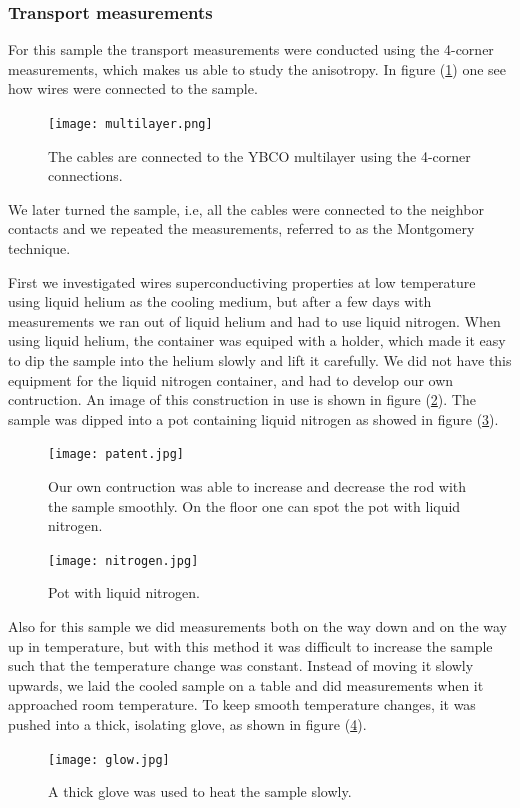 \documentclass{comjnl}
\begin{document}
\subsubsection{Transport measurements}
For this sample the transport measurements were conducted using the 4-corner measurements, which makes us able to study the anisotropy. In figure (\ref{fig:multilayer}) one see how wires were connected to the sample.
\begin{figure}[h]
\centering
\texttt{[image: multilayer.png]}
\caption{The cables are connected to the YBCO multilayer using the 4-corner connections. \label{fig:multilayer}}
\end{figure}
We later turned the sample, i.e, all the cables were connected to the neighbor contacts and we repeated the measurements, referred to as the Montgomery technique. 

First we investigated wires superconductiving properties at low temperature using liquid helium as the cooling medium, but after a few days with measurements we ran out of liquid helium and had to use liquid nitrogen. When using liquid helium, the container was equiped with a holder, which made it easy to dip the sample into the helium slowly and lift it carefully. We did not have this equipment for the liquid nitrogen container, and had to develop our own contruction. An image of this construction in use is shown in figure (\ref{fig:patent}). The sample was dipped into a pot containing liquid nitrogen as showed in figure (\ref{fig:nitrogen}). 
\begin{figure}[h]
\centering
\texttt{[image: patent.jpg]}
\caption{Our own contruction was able to increase and decrease the rod with the sample smoothly. On the floor one can spot the pot with liquid nitrogen. \label{fig:patent}}
\end{figure}
\begin{figure}[h]
\centering
\texttt{[image: nitrogen.jpg]}
\caption{Pot with liquid nitrogen. \label{fig:nitrogen}}
\end{figure}
Also for this sample we did measurements both on the way down and on the way up in temperature, but with this method it was difficult to increase the sample such that the temperature change was constant. Instead of moving it slowly upwards, we laid the cooled sample on a table and did measurements when it approached room temperature. To keep smooth temperature changes, it was pushed into a thick, isolating glove, as shown in figure (\ref{fig:glove}).
\begin{figure}[h]
\centering
\texttt{[image: glow.jpg]}
\caption{A thick glove was used to heat the sample slowly. \label{fig:glove}}
\end{figure}
\end{document}
